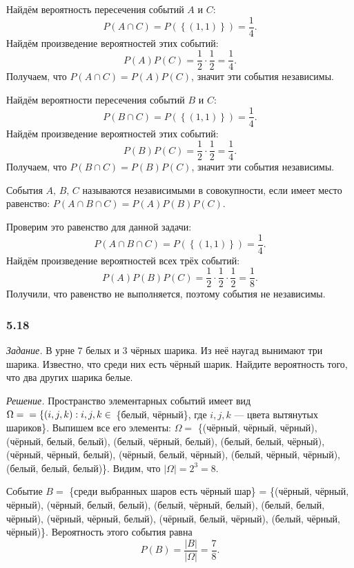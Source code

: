 Найдём вероятность пересечения событий $A$ и $C$:
$$P \left( A \cap C \right) =
P \left( \left\{ \left( 1, 1 \right) \right\} \right) =
\frac{1}{4}.$$
Найдём произведение вероятностей этих событий:
$$P \left( A \right) P \left( C \right) =
\frac{1}{2} \cdot \frac{1}{2} =
\frac{1}{4}.$$
Получаем, что $P \left( A \cap C \right) = P \left( A \right) P \left( C \right) $, значит эти события независимы.

Найдём вероятности пересечения событий $B$ и $C$:
$$P \left( B \cap C \right) =
P \left( \left\{ \left( 1, 1 \right) \right\} \right) =
\frac{1}{4}.$$
Найдём произведение вероятностей этих событий:
$$P \left( B \right) P \left( C \right) =
\frac{1}{2} \cdot \frac{1}{2} =
\frac{1}{4}.$$
Получаем, что $P \left( B \cap C \right) = P \left( B \right) P \left( C \right) $, значит эти события независимы.

События $A, \, B, \, C$ называются независимыми в совокупности, если имеет место равенство:
$P \left( A \cap B \cap C \right) =
P \left( A \right) P \left( B \right) P \left( C \right) $.

Проверим это равенство для данной задачи:
$$P \left( A \cap B \cap C \right) =
P \left( \left\{ \left( 1, 1 \right) \right\} \right) =
\frac{1}{4}.$$
Найдём произведение вероятностей всех трёх событий:
$$P \left( A \right) P \left( B \right) P \left( C \right) =
\frac{1}{2} \cdot \frac{1}{2} \cdot \frac{1} {2} =
\frac{1}{8}.$$
Получили, что равенство не выполняется, поэтому события не независимы.

\subsubsection*{5.18}

\textit{Задание.} В урне $7$ белых и $3$ чёрных шарика.
Из неё наугад вынимают три шарика.
Известно, что среди них есть чёрный шарик.
Найдите вероятность того, что два других шарика белые.

\textit{Решение.}
Пространство элементарных событий имеет вид
$ \Omega = \\ = \left\{ \left( i, j, k \right): i, j, k \in \right.$ \{белый, чёрный\}, где $i, j, k$ --- цвета вытянутых шариков\}.
Выпишем все его элементы: $ \Omega = $ \{(чёрный, чёрный, чёрный), (чёрный, белый, белый), (белый, чёрный, белый), (белый, белый, чёрный),
(чёрный, чёрный, белый), (чёрный, белый, чёрный), (белый, чёрный, чёрный), (белый, белый, белый)\}.
Видим, что $ \left| \Omega \right| = 2^3 = 8$.

Событие $B =$ \{среди выбранных шаров есть чёрный шар\} = \{(чёрный, чёрный, чёрный),
(чёрный, белый, белый), (белый, чёрный, белый), (белый, белый, чёрный),
(чёрный, чёрный, белый), (чёрный, белый, чёрный), (белый, чёрный, чёрный)\}.
Вероятность этого события равна
$$P \left( B \right) =
\frac{ \left| B \right| }{ \left| \Omega \right| } =
\frac{7}{8}.$$

